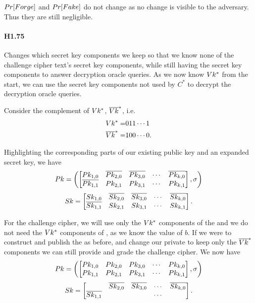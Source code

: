 $Pr[Forge]$ and $Pr[Fake]$ do not change as no change is visible to the adversary.
Thus they are still negligible.

\paragraph{H1.75}

Changes which secret key components we keep
so that we know none of the challenge cipher text's secret key components,
while still having the secret key components to answer decryption oracle queries.
%
As we now know $Vk^*$ from the start,
 we can use the secret key components not used by $C^*$ to decrypt the decryption oracle queries.
%

Consider the complement of $Vk^*$, $\overline{Vk}^*$, i.e.
\begin{align*}
Vk^*                 = & 011 \cdots 1\\
\overline{Vk}^* = & 100 \cdots 0.
\end{align*}

Highlighting the corresponding parts of our existing public key and an expanded secret key, we have
\[
Pk = \left(
\begin{bmatrix}
Pk_{1,0}                  & \overline{Pk_{2,0}}  & \overline{Pk_{3,0}}  & \cdots  & \overline{Pk_{k,0}}  \\
\overline{Pk_{1,1}}  & Pk_{2,1}                  & Pk_{3,1}                  & \cdots  & Pk_{k,1}  \\
\end{bmatrix}, \sigma  \right)
\]
\[
Sk =
\begin{bmatrix}
Sk_{1,0}                  & \overline{Sk_{2,0}}  & \overline{Sk_{3,0}}  & \cdots  & \overline{Sk_{k,0}}  \\
\overline{Sk_{1,1}}  & Sk_{2,1}                  & Sk_{3,1}                  & \cdots  & Sk_{k,1}  \\
\end{bmatrix}.
\]

For the challenge cipher, we will use only the $Vk^*$ components of the \Pk and
we do not need the $Vk^*$ components of \Sk,
as we know the value of $b$.
If we were to construct and publish the \Pk as before,
and change our private \Sk to keep only the $\overline{Vk}^*$ components
we can still provide and grade the challenge cipher. We now have
\[
Pk = \left(
\begin{bmatrix}
Pk_{1,0}  & Pk_{2,0}  & Pk_{3,0}  & \cdots  & Pk_{k,0}  \\
Pk_{1,1}  & Pk_{2,1}  & Pk_{3,1}  & \cdots  & Pk_{k,1}  \\
\end{bmatrix}, \sigma  \right)
\]
\[
Sk =
\begin{bmatrix}
                                & \overline{Sk_{2,0}}  & \overline{Sk_{3,0}}  & \cdots  & \overline{Sk_{k,0}}  \\
\overline{Sk_{1,1}}  &                                 &                                  & \cdots  &        \\
\end{bmatrix}.
\]

